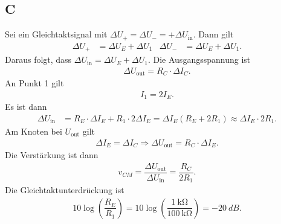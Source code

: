 \documentclass[a4paper,12pt]{article}
\numberwithin{equation}{section}
\begin{document}
\subsection{C}
Sei ein Gleichtaktsignal mit $\Delta U_+=\Delta U_-=+\Delta U_\text{in}$.
Dann gilt
\begin{align} 
        &&&& \Delta U_+ &= \Delta U_E+\Delta U_1 & \Delta U_- &= \Delta U_E+\Delta U_1. &&&& 
\end{align} 
Daraus folgt, dass $\Delta U_\text{in}=\Delta U_E+\Delta U_1$.
Die Ausgangsspannung ist
\begin{align} 
        \Delta U_\text{out}=R_C\cdot \Delta I_C
.\end{align} 
An Punkt 1 gilt
\begin{align}
        I_1=2I_E
.\end{align} 
Es ist dann
\begin{align} 
        &&&& \Delta U_\text{in} &= R_E\cdot \Delta I_E+R_1 \cdot 2\Delta I_E = \Delta I_E\left(R_E+2R_1\right)\approx \Delta I_E\cdot 2R_1. &&&& 
\end{align} 
Am Knoten bei $U_\text{out}$ gilt
\begin{align} 
        \Delta I_E=\Delta I_C\Rightarrow \Delta U_\text{out}=R_C\cdot \Delta I_E
.\end{align} 
Die Verstärkung ist dann
\begin{align} 
        v_{CM}=\dfrac{\Delta U_\text{out}}{\Delta U_\text{in}}=\dfrac{R_C}{2R_1}
.\end{align} 
Die Gleichtaktunterdrückung ist
\begin{align} 
        10\log \left(\dfrac{R_E}{R_1}\right)=10\log \left(\dfrac{\SI{1}{\kilo\ohm}}{\SI{100}{\kilo\ohm}}\right)=-\SI{20}{dB}
.\end{align} 
\end{document}
